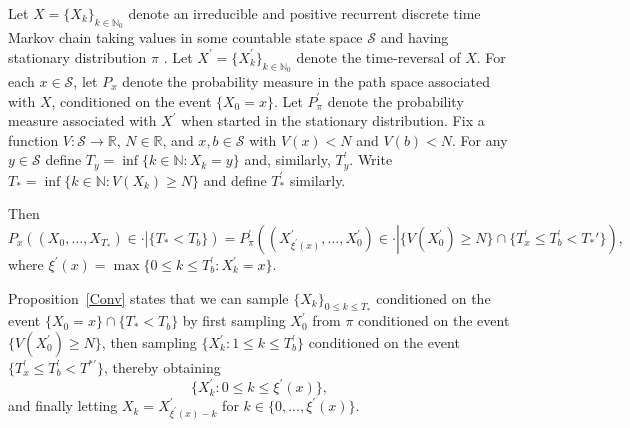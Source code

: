 \begin{proposition}
\label{Conv} Let $X=\{X_{k}\}_{k\in \mathbb{N}_{0}}$ denote an irreducible
and positive recurrent discrete time Markov chain taking values in some
countable state space $\mathcal{S}$ and having stationary distribution $\pi $%
. Let $X^{\prime }=\{X_{k}^{\prime }\}_{k\in \mathbb{N}_{0}}$ denote the
time-reversal of $X$. For each $x\in \mathcal{S}$, let $P_{x}$ denote the
probability measure in the path space associated with $X$, conditioned on
the event $\{X_{0}=x\}$. Let $P_{\pi }^{\prime }$ denote the probability
measure associated with $X^{\prime }$ when started in the stationary
distribution. Fix a function $V:\mathcal{S}\longrightarrow \mathbb{R}$, $%
N\in {\mathbb{R}}$, and $x,b\in \mathcal{S}$ with $V(x)<N$ and $V\left(
b\right) <N$. For any $y\in \mathcal{S}$ define $T_{y}=\inf \{k\in \mathbb{N}%
:X_{k}=y\}$ and, similarly, $T_{y}^{\prime }$. Write $T_{\ast }=\inf \{k\in
\mathbb{N}:V(X_{k})\geq N\}$ and define $T_{\ast }^{\prime }$ similarly.

Then
\begin{equation*}
P_{x}\left( \left. \left( X_{0},\ldots ,X_{T_{\ast }}\right) \in \cdot
\right\vert \{T_{\ast }<T_{b}\}\right) =P_{\pi }^{\prime }\left( \left.
\left( X_{\xi ^{\prime }(x)}^{\prime },\ldots ,X_{0}^{\prime }\right) \in
\cdot \right\vert \{V\left( X_{0}^{\prime }\right) \geq N\}\cap
\{T_{x}^{\prime }\leq T_{b}^{\prime }<T_*'\}\right) ,
\end{equation*}%
where $\xi ^{\prime }\left( x\right) =\max \{0\leq k\leq T_{b}^{\prime
}:X_{k}^{\prime }=x\}$.
\end{proposition}

Proposition~\ref{Conv} states that we can sample $\{X_{k}\}_{0\leq k\leq
T_{\ast }}$ conditioned on the event $\{X_{0}=x\}\cap \{T_{\ast }<T_{b}\}$
by first sampling $X_{0}^{\prime }$ from $\pi $ conditioned on the event $%
\{V\left( X_{0}^{\prime }\right) \geq N\}$, then sampling $\{X_{k}^{\prime
}:1\leq k\leq T_{b}^{\prime }\}$ conditioned on the event $\{T_{x}^{\prime
}\leq T_{b}^{\prime }<T^{\ast \prime }\}$, thereby obtaining
\begin{equation*}
\{X_{k}^{\prime }:0\leq k\leq \xi ^{\prime }\left( x\right) \},
\end{equation*}%
and finally letting $X_{k}=X_{\xi ^{\prime }\left( x\right) -k}^{\prime }$
for $k\in \{0,...,\xi ^{\prime }\left( x\right) \}$.

